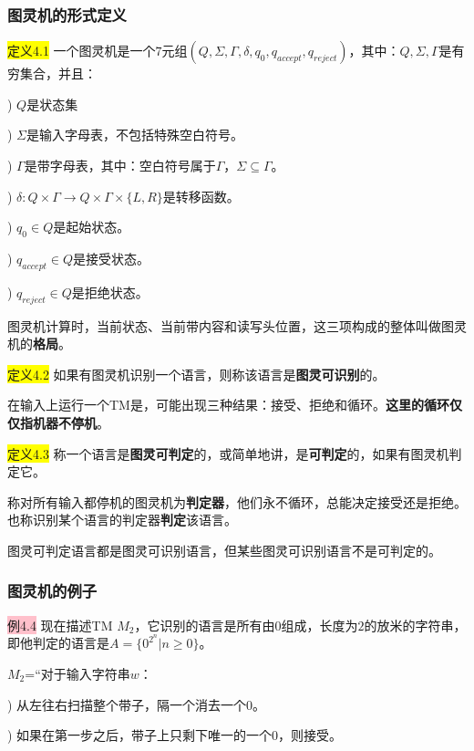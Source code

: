 \documentclass[a4paper]{article}
\begin{document}
\subsubsection{图灵机的形式定义}

	\colorbox{yellow}{定义4.1} 一个图灵机是一个$7$元组$(Q,\Sigma,\Gamma,\delta,q_0,q_{accept},q_{reject})$，其中：$Q,\Sigma,\Gamma$是有穷集合，并且：
	
	) $Q$是状态集
	
	) $\Sigma$是输入字母表，不包括特殊空白符号。
	
	) $\Gamma$是带字母表，其中：空白符号属于$\Gamma$，$\Sigma \subseteq \Gamma$。
	
	) $\delta:Q \times \Gamma \rightarrow Q \times \Gamma \times \{L,R\}$是转移函数。
	
	) $q_0 \in Q$是起始状态。
	
	) $q_{accept} \in Q$是接受状态。
	
	) $q_{reject} \in Q$是拒绝状态。
	
	图灵机计算时，当前状态、当前带内容和读写头位置，这三项构成的整体叫做图灵机的\textbf{格局}。

	\colorbox{yellow}{定义4.2} 如果有图灵机识别一个语言，则称该语言是\textbf{图灵可识别}的。

	在输入上运行一个TM是，可能出现三种结果：接受、拒绝和循环。\textbf{这里的循环仅仅指机器不停机}。
	
	\colorbox{yellow}{定义4.3} 称一个语言是\textbf{图灵可判定}的，或简单地讲，是\textbf{可判定}的，如果有图灵机判定它。
	
	称对所有输入都停机的图灵机为\textbf{判定器}，他们永不循环，总能决定接受还是拒绝。也称识别某个语言的判定器\textbf{判定}该语言。
	
	图灵可判定语言都是图灵可识别语言，但某些图灵可识别语言不是可判定的。

\subsubsection{图灵机的例子}

	\colorbox{pink}{例4.4} 现在描述TM $M_2$，它识别的语言是所有由$0$组成，长度为$2$的放米的字符串，即他判定的语言是$A=\{0^{2^n}|n \geq 0\}$。
	
	$M_2$=“对于输入字符串$w$：
	
	) 从左往右扫描整个带子，隔一个消去一个$0$。
	
	) 如果在第一步之后，带子上只剩下唯一的一个$0$，则接受。
	
\end{document}
